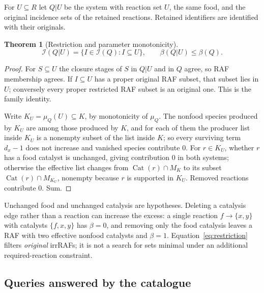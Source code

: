\documentclass[11pt,a4paper]{article}
\theoremstyle{plain}
\newtheorem{theorem}{Theorem}[section]
\theoremstyle{definition}
\theoremstyle{remark}
\newcommand{\Irr}{\mathcal I}
\newcommand{\muQ}{\mu_Q}
\newcommand{\Cat}{\operatorname{Cat}}
\begin{document}
For $U\subseteq R$ let $Q|U$ be the system with reaction set $U$, the same food, and the original incidence sets of the retained reactions. Retained identifiers are identified with their originals.

\begin{theorem}[Restriction and parameter monotonicity]\label{thm:restrict}
\begin{equation}\label{eq:restriction}
 \Irr(Q|U)=\{I\in\Irr(Q):I\subseteq U\},\qquad \beta(Q|U)\le\beta(Q).
\end{equation}
\end{theorem}
\begin{proof}
For $S\subseteq U$ the closure stages of $S$ in $Q|U$ and in $Q$ agree, so RAF membership agrees. If $I\subseteq U$ has a proper original RAF subset, that subset lies in $U$; conversely every proper restricted RAF subset is an original one. This is the family identity.

Write $K_U=\muQ(U)\subseteq K$, by monotonicity of $\muQ$. The nonfood species produced by $K_U$ are among those produced by $K$, and for each of them the producer list inside $K_U$ is a nonempty subset of the list inside $K$; so every surviving term $d_x-1$ does not increase and vanished species contribute $0$. For $r\in K_U$, whether $r$ has a food catalyst is unchanged, giving contribution $0$ in both systems; otherwise the effective list changes from $\Cat(r)\cap M_K$ to its subset $\Cat(r)\cap M_{K_U}$, nonempty because $r$ is supported in $K_U$. Removed reactions contribute $0$. Sum.
\end{proof}

Unchanged food and unchanged catalysis are hypotheses. Deleting a catalysis edge rather than a reaction can increase the excess: a single reaction $f\to\{x,y\}$ with catalysts $\{f,x,y\}$ has $\beta=0$, and removing only the food catalysis leaves a RAF with two effective nonfood catalysts and $\beta=1$. Equation~\eqref{eq:restriction} filters \emph{original} irrRAFs; it is not a search for sets minimal under an additional required-reaction constraint.

\subsection{Queries answered by the catalogue}
\end{document}
